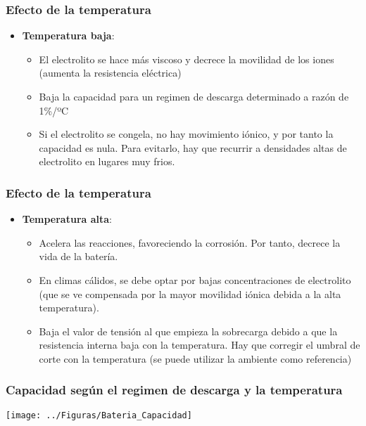 \documentclass[serif, xcolor=dvipsnames]{beamer}
\begin{document}
\begin{frame}
\frametitle{Efecto de la temperatura}
\begin{itemize}
\item \textbf{Temperatura baja}:

\begin{itemize}
\item El electrolito se hace más viscoso y decrece la movilidad de los iones
(aumenta la resistencia eléctrica)
\item Baja la capacidad para un regimen de descarga determinado a razón
de 1\%/ºC
\item Si el electrolito se congela, no hay movimiento iónico, y por tanto
la capacidad es nula. Para evitarlo, hay que recurrir a densidades
altas de electrolito en lugares muy frios.
\end{itemize}
\end{itemize}

\end{frame}

\begin{frame}
\frametitle{Efecto de la temperatura}
\begin{itemize}
\item \textbf{Temperatura alta}:

\begin{itemize}
\item Acelera las reacciones, favoreciendo la corrosión. Por tanto, decrece
la vida de la batería.
\item En climas cálidos, se debe optar por bajas concentraciones de electrolito
(que se ve compensada por la mayor movilidad iónica debida a la alta
temperatura).
\item Baja el valor de tensión al que empieza la sobrecarga debido a que
la resistencia interna baja con la temperatura. Hay que corregir el
umbral de corte con la temperatura (se puede utilizar la ambiente
como referencia)
\end{itemize}
\end{itemize}

\end{frame}

\begin{frame}[plain]
\frametitle{Capacidad según el regimen de descarga y la temperatura}

\begin{center}
\texttt{[image: ../Figuras/Bateria\_Capacidad]}
\par\end{center}


\end{frame}
\end{document}
